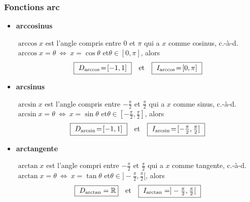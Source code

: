 \documentclass[10pt]{beamer}
\newcommand{\bitem}{\item[$\bullet$]}
\newcommand{\R}{\mathbb R}
\begin{document}



\begin{frame}[plain]
\frametitle{\bf Fonctions arc}
\medskip 

\begin{itemize}
\bitem
{\bf arccosinus}\ \quad 
\vspace*{1mm}

$\arccos x$ est l'angle compris entre $0$ et $\pi$ qui a $x$ comme cosinus, 
c.-\`a-d.\quad $\arccos x = \theta \ \Leftrightarrow\ x=\cos \theta$\quad 
et\quad $\theta\in [0,\pi]$, alors
$$
\mbox{
\framebox{\ $D_{\arccos}\!=\![-1,1]$\ }\quad et\quad 
\framebox{\ $I_{\arccos}\!=\![0,\pi]$\ }
}
$$
\vspace*{1mm}

\pause
\bitem
{\bf arcsinus}\ \quad 
\vspace*{1mm}

$\arcsin x$ est l'angle compris entre $-\frac{\pi}{2}$ et $\frac{\pi}{2}$ 
qui a $x$ comme sinus, c.-\`a-d.\quad 
$\arcsin x = \theta \ \Leftrightarrow\ x=\sin \theta$\quad 
et\quad $\theta\in [-\frac{\pi}{2},\frac{\pi}{2}]$, alors\quad 
$$
\mbox{
\framebox{\ $D_{\arcsin}\!=\![-1,1]$\ }\quad et\quad 
\framebox{\ $I_{\arcsin}\!=\![-\frac{\pi}{2},\frac{\pi}{2}]$\ }
}
$$
\vspace*{1mm}

\pause
\bitem
{\bf arctangente}\ \quad 
\vspace*{1mm}

$\arctan x$ est l'angle compri entre $-\frac{\pi}{2}$ et $\frac{\pi}{2}$ 
qui a $x$ comme tangente, c.-\`a-d.\quad 
$\arctan x = \theta \ \Leftrightarrow\ x=\tan \theta$\quad 
et\quad $\theta\in ]-\frac{\pi}{2},\frac{\pi}{2}[$, alors\quad 
$$
\mbox{
\framebox{\ $D_{\arctan}=\R$}\quad et\quad 
\framebox{\ $I_{\arctan}=]-\frac{\pi}{2},\frac{\pi}{2}[$\ }
}
$$
\end{itemize}

\end{frame}

\end{document}
